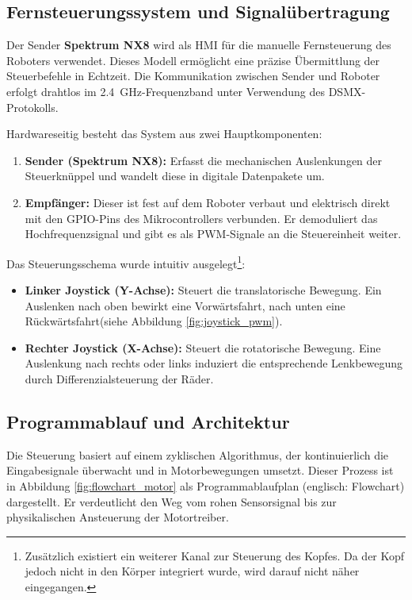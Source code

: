 \subsection{Fernsteuerungssystem und Signalübertragung}
\label{cha:Fernsteuerungssystem und Signalübertragung}

Der Sender \textbf{Spektrum NX8} wird als HMI für die manuelle Fernsteuerung des Roboters verwendet. Dieses Modell ermöglicht eine präzise Übermittlung der Steuerbefehle in Echtzeit. Die Kommunikation zwischen Sender und Roboter erfolgt drahtlos im \SI{2.4}{\giga\hertz}-Frequenzband unter Verwendung des DSMX-Protokolls. \autocite{NX8}

Hardwareseitig besteht das System aus zwei Hauptkomponenten:
\begin{enumerate}
	\item \textbf{Sender (Spektrum NX8):} Erfasst die mechanischen Auslenkungen der Steuerknüppel und wandelt diese in digitale Datenpakete um.
	\item \textbf{Empfänger:} Dieser ist fest auf dem Roboter verbaut und elektrisch direkt mit den GPIO-Pins des Mikrocontrollers verbunden. Er demoduliert das Hochfrequenzsignal und gibt es als PWM-Signale an die Steuereinheit weiter.
\end{enumerate}

Das Steuerungsschema wurde intuitiv ausgelegt\footnote{Zusätzlich existiert ein weiterer Kanal zur Steuerung des Kopfes. Da der Kopf jedoch nicht in den Körper integriert wurde, wird darauf nicht näher eingegangen.}:
\begin{itemize}
	\item \textbf{Linker Joystick (Y-Achse):} Steuert die translatorische Bewegung. Ein Auslenken nach oben bewirkt eine Vorwärtsfahrt, nach unten eine Rückwärtsfahrt(siehe Abbildung \ref{fig:joystick_pwm}).
	\item \textbf{Rechter Joystick (X-Achse):} Steuert die rotatorische Bewegung. Eine Auslenkung nach rechts oder links induziert die entsprechende Lenkbewegung durch Differenzialsteuerung der Räder.
\end{itemize}


\subsection{Programmablauf und Architektur}
\label{cha:Programmablauf und Architektur}

Die Steuerung basiert auf einem zyklischen Algorithmus, der kontinuierlich die Eingabesignale überwacht und in Motorbewegungen umsetzt. Dieser Prozess ist in Abbildung \ref{fig:flowchart_motor} als Programmablaufplan (englisch: Flowchart) dargestellt. Er verdeutlicht den Weg vom rohen Sensorsignal bis zur physikalischen Ansteuerung der Motortreiber.


